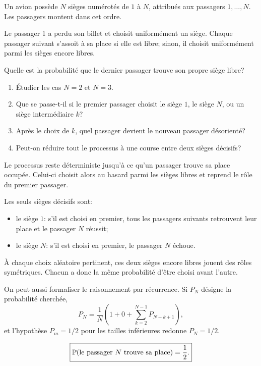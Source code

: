 \documentclass[11pt,a4paper]{article}
\begin{document}

\begin{statementbox}
Un avion possède $N$ sièges numérotés de $1$ à $N$, attribués aux passagers
$1,\ldots,N$. Les passagers montent dans cet ordre.

Le passager 1 a perdu son billet et choisit uniformément un siège. Chaque
passager suivant s'assoit à sa place si elle est libre; sinon, il choisit
uniformément parmi les sièges encore libres.

Quelle est la probabilité que le dernier passager trouve son propre siège
libre?
\end{statementbox}

\begin{hintsbox}
\begin{enumerate}
  \item Étudier les cas $N=2$ et $N=3$.
  \item Que se passe-t-il si le premier passager choisit le siège $1$, le
  siège $N$, ou un siège intermédiaire $k$?
  \item Après le choix de $k$, quel passager devient le nouveau passager
  désorienté?
  \item Peut-on réduire tout le processus à une course entre deux sièges
  décisifs?
\end{enumerate}
\end{hintsbox}

\correction

Le processus reste déterministe jusqu'à ce qu'un passager trouve sa place
occupée. Celui-ci choisit alors au hasard parmi les sièges libres et reprend le
rôle du premier passager.

Les seuls sièges décisifs sont:
\begin{itemize}
  \item le siège $1$: s'il est choisi en premier, tous les passagers suivants
  retrouvent leur place et le passager $N$ réussit;
  \item le siège $N$: s'il est choisi en premier, le passager $N$ échoue.
\end{itemize}

À chaque choix aléatoire pertinent, ces deux sièges encore libres jouent des
rôles symétriques. Chacun a donc la même probabilité d'être choisi avant
l'autre.

On peut aussi formaliser le raisonnement par récurrence. Si $P_N$ désigne la
probabilité cherchée,
\[
P_N=\frac1N\left(1+0+\sum_{k=2}^{N-1}P_{N-k+1}\right),
\]
et l'hypothèse $P_m=1/2$ pour les tailles inférieures redonne $P_N=1/2$.

\begin{resultbox}
\[
\boxed{\mathbb P(\text{le passager }N\text{ trouve sa place})=\frac12.}
\]
\end{resultbox}
\end{document}
